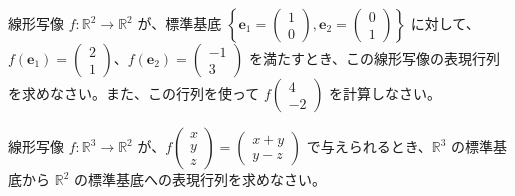 \begin{quiz}
線形写像 $f: \mathbb{R}^2 \to \mathbb{R}^2$ が、標準基底 $\left\{ \bm{e}_1=\begin{pmatrix} 1 \\ 0 \end{pmatrix}, \bm{e}_2=\begin{pmatrix} 0 \\ 1 \end{pmatrix} \right\}$ に対して、$f(\bm{e}_1) = \begin{pmatrix} 2 \\ 1 \end{pmatrix}$、$f(\bm{e}_2) = \begin{pmatrix} -1 \\ 3 \end{pmatrix}$ を満たすとき、この線形写像の表現行列を求めなさい。また、この行列を使って $f\begin{pmatrix} 4 \\ -2 \end{pmatrix}$ を計算しなさい。
\end{quiz}

\begin{quiz}
線形写像 $f: \mathbb{R}^3 \to \mathbb{R}^2$ が、$f\begin{pmatrix} x \\ y \\ z \end{pmatrix} = \begin{pmatrix} x+y \\ y-z \end{pmatrix}$ で与えられるとき、$\mathbb{R}^3$ の標準基底から $\mathbb{R}^2$ の標準基底への表現行列を求めなさい。
\end{quiz}